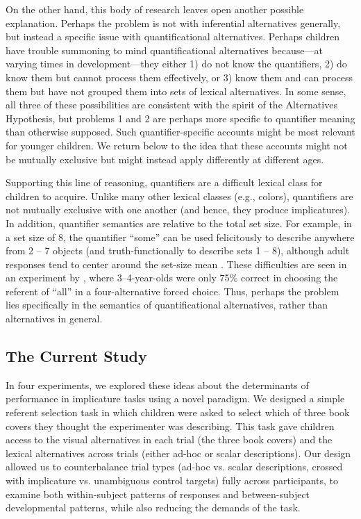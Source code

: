 \documentclass[man]{apa2}
\begin{document}
On the other hand, this body of research leaves open another possible explanation. Perhaps the problem is not with inferential alternatives generally, but instead a specific issue with quantificational alternatives. Perhaps children have trouble summoning to mind quantificational alternatives because---at varying times in development---they either 1) do not know the quantifiers, 2) do know them but cannot process them effectively, or 3) know them and can process them but have not grouped them into sets of lexical alternatives. In some sense, all three of these possibilities are consistent with the spirit of the Alternatives Hypothesis, but problems 1 and 2 are perhaps more specific to quantifier meaning than otherwise supposed. Such quantifier-specific accounts might be most relevant for younger children. We return below to the idea that these accounts might not be mutually exclusive but might instead apply differently at different ages.

Supporting this line of reasoning, quantifiers are a difficult lexical class for children to acquire. Unlike many other lexical classes (e.g., colors), quantifiers are not mutually exclusive with one another (and hence, they produce implicatures). In addition, quantifier semantics are relative to the total set size. For example, in a set size of 8, the quantifier ``some'' can be used felicitously to describe anywhere from 2 -- 7 objects \cite{barner2009} (and truth-functionally to describe sets 1 -- 8), although adult responses tend to center around the set-size mean \cite{franke2014}. These difficulties are seen in an experiment by ,  where 3--4-year-olds were only 75\% correct in choosing the referent of ``all'' in a four-alternative forced choice. Thus, perhaps the problem lies specifically in the semantics of quantificational alternatives, rather than alternatives in general.

\subsection{The Current Study}

In four experiments, we explored these ideas about the determinants of performance in implicature tasks using a novel paradigm. We designed a simple referent selection task in which children were asked to select which of three book covers they thought the experimenter was describing. This task gave children access to the visual alternatives in each trial (the three book covers) and the lexical alternatives across trials (either ad-hoc or scalar descriptions). Our design allowed us to counterbalance trial types (ad-hoc vs. scalar descriptions, crossed with implicature vs. unambiguous control targets) fully across participants, to examine both within-subject patterns of responses and between-subject developmental patterns, while also reducing the demands of the task.
\end{document}
